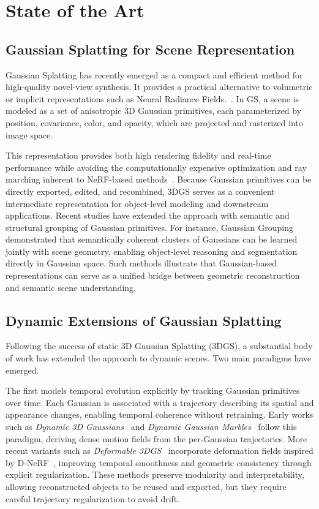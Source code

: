 \chapter{State of the Art}

\section{Gaussian Splatting for Scene Representation}

Gaussian Splatting has recently emerged as a compact and efficient method for high-quality novel-view synthesis. It provides a practical alternative to volumetric or implicit representations such as Neural Radiance Fields.~\cite{mildenhall2021nerf,barron2021mip,barron2023zipnerf}. 
In GS, a scene is modeled as a set of anisotropic 3D Gaussian primitives, each parameterized by position, covariance, color, and opacity, which are projected and rasterized into image space. 

This representation provides both high rendering fidelity and real-time performance while avoiding the computationally expensive optimization and ray marching inherent to NeRF-based methods~\cite{kerbl3Dgaussians}. 
Because Gaussian primitives can be directly exported, edited, and recombined, 3DGS serves as a convenient intermediate representation for object-level modeling and downstream applications.
Recent studies have extended the approach with semantic and structural grouping of Gaussian primitives.
For instance, Gaussian Grouping~\cite{gaussian_grouping} demonstrated that semantically coherent clusters of Gaussians can be learned jointly with scene geometry, enabling object-level reasoning and segmentation directly in Gaussian space.
Such methods illustrate that Gaussian-based representations can serve as a unified bridge between geometric reconstruction and semantic scene understanding.

\section{Dynamic Extensions of Gaussian Splatting}

Following the success of static 3D Gaussian Splatting (3DGS), a substantial body of work has extended the approach to dynamic scenes. 
Two main paradigms have emerged.

The first models temporal evolution explicitly by tracking Gaussian primitives over time. 
Each Gaussian is associated with a trajectory describing its spatial and appearance changes, enabling temporal coherence without retraining. 
Early works such as \textit{Dynamic 3D Gaussians}~\cite{luiten2024dynamic} and \textit{Dynamic Gaussian Marbles}~\cite{stearnsmarbels} follow this paradigm, deriving dense motion fields from the per-Gaussian trajectories. 
More recent variants such as \textit{Deformable 3DGS}~\cite{yang2024deformable} incorporate deformation fields inspired by D-NeRF~\cite{pumarola2021d}, improving temporal smoothness and geometric consistency through explicit regularization. 
These methods preserve modularity and interpretability, allowing reconstructed objects to be reused and exported, but they require careful trajectory regularization to avoid drift.

